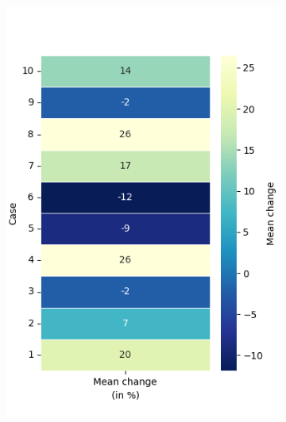 \begin{figure}[h!]
\begin{subfigure}[t]{0.48\textwidth}
		\includegraphics[width=\textwidth]{Figures/DP_mean_heatmap_percentage.png}
		\label{fig: DP_mean}
		\caption{}
	\end{subfigure}
	\hfill
	\begin{subfigure}[t]{0.48\textwidth}
		\centering

\end{subfigure}
\end{figure}
